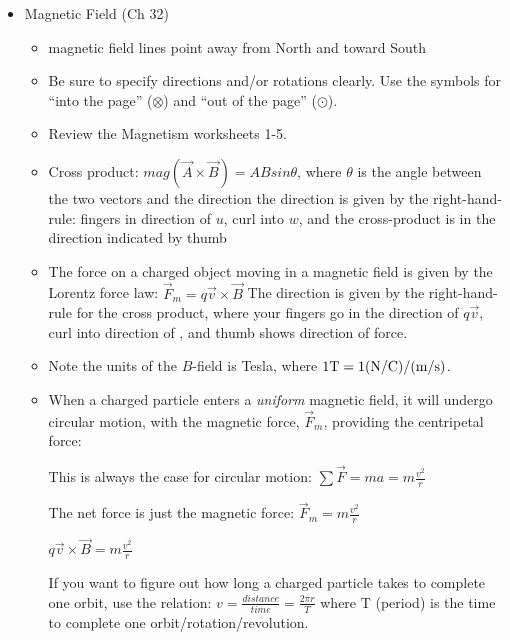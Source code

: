\begin{itemize}
\item Magnetic Field (Ch 32)
\begin{itemize}
\item magnetic field lines point away from North and toward South
\item Be sure to specify directions and/or rotations clearly.  Use the
  symbols for ``into the page'' ($\otimes$) and ``out of the page''
  ($\odot$).
\item Review the Magnetism worksheets 1-5.
\item Cross product: 
$mag(\vec{A} \times \vec{B}) = A B sin\theta$, where $\theta$ is the
  angle between the two vectors and the direction the direction is
  given by the right-hand-rule:  fingers in direction of $u$, curl
  into $w$, and the cross-product is in the direction indicated by
  thumb 
\item The force on a charged object moving in a magnetic field is
  given by the Lorentz force law: $\vec{F}_m = q \vec{v} \times \vec{B}
  $ The direction is given by the right-hand-rule for the cross
  product, where your fingers go in the direction of $q\vec{v}$, curl
  into direction of \bt, and thumb shows direction of force.
\item Note the units of the $B$-field \bt{} is Tesla, where $\rm 1 T =
  1 (N/C)/(m/s)$. 
\item When a charged particle enters a \emph{uniform} magnetic field,
  it will undergo circular motion, with the magnetic force,
  $\vec{F}_m$, providing the centripetal force:

This is always the case for circular motion: $\displaystyle \sum
\vec{F} = m a = m \frac{v^2}{r}$

The net force is just the magnetic force: $\displaystyle \vec{F}_m = m
\frac{v^2}{r}$

$\displaystyle  q \vec{v} \times \vec{B} = m \frac{v^2}{r}$ 

If you want to figure out how long a charged particle takes to
complete one orbit, use the relation: 
$\displaystyle v = \frac{distance}{time} = \frac{2 \pi r}{T}$
where T (period) is the time to complete one
orbit/rotation/revolution. 
\end{itemize}


\end{itemize}
